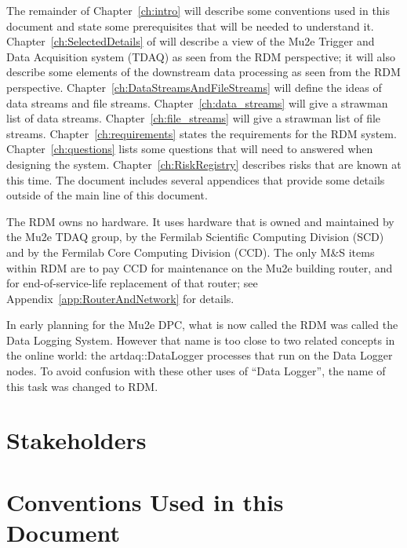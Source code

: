 The remainder of Chapter~\ref{ch:intro} will describe some conventions used in this document and
state some prerequisites that will be needed to understand it.
Chapter~\ref{ch:SelectedDetails}  of will describe a view of the
Mu2e Trigger and Data Acquisition system (TDAQ) as seen from the RDM perspective;
it will also describe some elements of the downstream data processing as seen
from the RDM perspective.
Chapter~\ref{ch:DataStreamsAndFileStreams} will define the ideas of data streams and file streams.
Chapter~\ref{ch:data_streams} will give a strawman list of data streams.
Chapter~\ref{ch:file_streams} will give a strawman list of file streams.
Chapter~\ref{ch:requirements} states the requirements for the RDM system.
Chapter~\ref{ch:questions} lists some questions that will need to answered when designing the system.
Chapter~\ref{ch:RiskRegistry} describes risks that are known at this time.
The document includes several appendices that provide some details outside of the main line
of this document.



The RDM owns no hardware.  It uses hardware that is owned and maintained
by the Mu2e TDAQ group,
by the Fermilab Scientific Computing Division (SCD)
and by the Fermilab Core Computing Division (CCD).
The only M\&S items within RDM are to pay CCD for maintenance on the Mu2e building router,
and for end-of-service-life replacement of that router;
see Appendix~\ref{app:RouterAndNetwork} for details.

In early planning for the Mu2e DPC, what is now called the RDM was called the Data Logging System.
However that name is too close to two related concepts in the online world:
the {\code artdaq::DataLogger} processes that run on the Data Logger nodes.
To avoid confusion with these other uses of ``Data Logger'',
the name of this task was changed to RDM.

\section{Stakeholders}
\label{sec:stakeholders}


\section{Conventions Used in this Document}
\label{sec:conventions}


